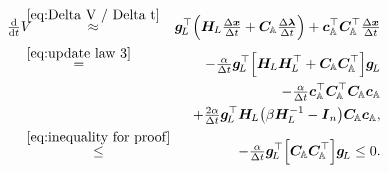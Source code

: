 \documentclass[journal]{IEEEtranTIE}
\begin{document}
\begin{eqnarray}
\ddtsmall V & \!\!\!\! \stackrel{\eqref{eq:Delta V / Delta t}}{\approx} \!\!\!\!  & \mv{g}_{\!L}^\top \Big( \mm{H}_{\! L}\tfrac{\Delta \mv{x}}{\Delta t}  + \mm{C}_{\!\mathbb{A}} \tfrac{\Delta \mv{\lambda}}{\Delta t}  \Big) + \mv{c}_{\mathbb{A}}^\top \mm{C}_{\!\mathbb{A}}^\top \tfrac{\Delta \mv{x}}{\Delta t} \notag \\
 & \!\!\!\! \stackrel{\eqref{eq:update law 3}}{=} \!\!\!\! & -\tfrac{\alpha}{\Delta t} \mv{g}_{\!L}^\top \Big[ \mm{H}_{\! L} \mm{H}_{\! L}^\top + \mm{C}_{\!\mathbb{A}} \mm{C}_{\!\mathbb{A}}^\top \Big] \mv{g}_{\!L} \notag \\
 & &  -\tfrac{\alpha}{\Delta t}  \mv{c}_{\mathbb{A}}^\top \mm{C}_{\!\mathbb{A}}^\top  \mm{C}_{\!\mathbb{A}} \mv{c}_{\mathbb{A}} \notag \\
 & & + \tfrac{2\alpha}{\Delta t} \mv{g}_{\!L}^\top \mm{H}_{\! L} \big(\beta \mm{H}_{\! L}^{-1} - \mm{I}_n \big) \mm{C}_{\!\mathbb{A}} \mv{c}_{\mathbb{A}} \label{eq:Delta V / Update 3}, \\
 & \!\!\!\! \stackrel{\eqref{eq:inequality for proof}}{\le} \!\!\!\! & -\tfrac{\alpha}{\Delta t} \mv{g}_{\!L}^\top \Big[\mm{C}_{\!\mathbb{A}} \mm{C}_{\!\mathbb{A}}^\top \Big] \mv{g}_{\!L} \le 0.\label{eq:Delta V / Upper Bound / Update 3}
\end{eqnarray}
\end{document}
